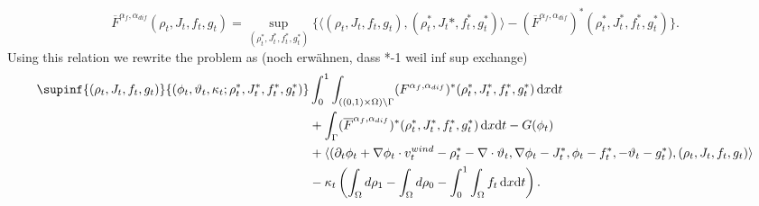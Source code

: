  $$
 \overline{F}^{\alpha_f,\alpha_{dif}}(\rho_t, J_t, f_t, g_t) = \sup_{(\rho_t^*, J_t^*, f_t^*, g_t^*)} \{\langle (\rho_t, J_t, f_t, g_t), (\rho_t^*, J_t*, f_t^*, g_t^*)\rangle - (\overline{F}^{\alpha_f,\alpha_{dif}})^*(\rho_t^*, J_t^*, f_t^*, g_t^*)\}.
 $$
  Using this relation we rewrite the problem as (noch erwähnen, dass *-1 weil inf sup exchange) 
\begin{align*}
	\supinf{(\rho_t,J_t,f_t,g_t)}{(\phi_t,\vartheta_t, \kappa_t; \rho_t^*, J_t^*, f_t^*, g_t^*)} %
	&\int_0^1\int_{((0,1)\times\Omega)\setminus\Gamma} (F^{\alpha_f, \alpha_{dif}})^*(\rho_t^*, J_t^*, f_t^*, g_t^*)\,\mathrm{d}x\mathrm{d}t \\&+ \int_\Gamma (\overline{F}^{\alpha_f, \alpha_{dif}})^*(\rho_t^*, J_t^*, f_t^*, g_t^*)\,\mathrm{d}x\mathrm{d}t -G(\phi_t) \\&+ \langle(\partial_t\phi_t + \nabla\phi_t \cdot v_t^{wind} - \rho_t^* -\nabla \cdot \vartheta_t, \nabla\phi_t - J_t^*, \phi_t - f_t^*, -\vartheta_t-g_t^*), (\rho_t, J_t, f_t, g_t)\rangle\\
																	&-\kappa_t\left(\int_\Omega d\rho_1 - \int_\Omega d\rho_0 - \int_0^1\int_\Omega f_t\,\mathrm{d}x\mathrm{d}t\right).
\end{align*}


